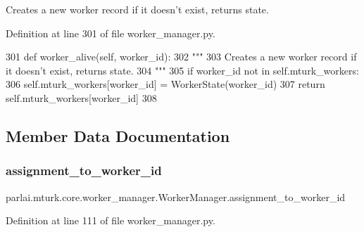 \begin{DoxyVerb}Creates a new worker record if it doesn't exist, returns state.
\end{DoxyVerb}
 

Definition at line 301 of file worker\+\_\+manager.\+py.


\begin{DoxyCode}
301     \textcolor{keyword}{def }worker\_alive(self, worker\_id):
302         \textcolor{stringliteral}{"""}
303 \textcolor{stringliteral}{        Creates a new worker record if it doesn't exist, returns state.}
304 \textcolor{stringliteral}{        """}
305         \textcolor{keywordflow}{if} worker\_id \textcolor{keywordflow}{not} \textcolor{keywordflow}{in} self.mturk\_workers:
306             self.mturk\_workers[worker\_id] = WorkerState(worker\_id)
307         \textcolor{keywordflow}{return} self.mturk\_workers[worker\_id]
308 
\end{DoxyCode}


\subsection{Member Data Documentation}
\mbox{\label{classparlai_1_1mturk_1_1core_1_1worker__manager_1_1WorkerManager_ad3bec2328ee19706027d1279e5910a22}} 
\subsubsection{\texorpdfstring{assignment\+\_\+to\+\_\+worker\+\_\+id}{assignment\_to\_worker\_id}}
{\footnotesize\ttfamily parlai.\+mturk.\+core.\+worker\+\_\+manager.\+Worker\+Manager.\+assignment\+\_\+to\+\_\+worker\+\_\+id}



Definition at line 111 of file worker\+\_\+manager.\+py.

\mbox{\label{classparlai_1_1mturk_1_1core_1_1worker__manager_1_1WorkerManager_a878a7bb6afd1530ecc8cc8852a8990a6}} 
